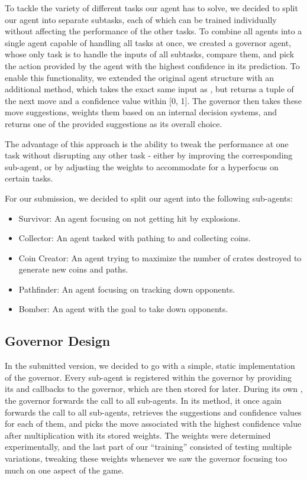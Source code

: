 To tackle the variety of different tasks our agent has to solve, we decided to split our agent into separate subtasks,
each of which can be trained individually without affecting the performance of the other tasks.
To combine all agents into a single agent capable of handling all tasks at once, we created a governor agent, whose only
task is to handle the inputs of all subtasks, compare them, and pick the action provided by the agent with the highest
confidence in its prediction.
To enable this functionality, we extended the original agent structure with an additional 
method, which takes the exact same input as , but returns a tuple of the next move and a confidence
value within [0, 1].
The governor then takes these move suggestions, weights them based on an internal decision systems, and returns one of
the provided suggestions as its overall choice.

The  advantage of this approach is the ability to tweak the performance at one task without disrupting any other task -
either by improving the corresponding sub-agent, or by adjusting the weights to accommodate for a hyperfocus on certain
tasks.

For our submission, we decided to split our agent into the following sub-agents:
\begin{itemize}
  \item Survivor: An agent focusing on not getting hit by explosions.
  \item Collector: An agent tasked with pathing to and collecting coins.
  \item Coin Creator: An agent trying to maximize the number of crates destroyed to generate new coins and paths.
  \item Pathfinder: An agent focusing on tracking down opponents.
  \item Bomber: An agent with the goal to take down opponents.
\end{itemize}

\subsection{Governor Design}
\label{subsec:design-governor}
In the submitted version, we decided to go with a simple, static implementation of the governor.
Every sub-agent is registered within the governor by providing its  and 
callbacks to the governor, which are then stored for later.
During its own , the governor forwards the call to all sub-agents.
In its  method, it once again forwards the call to all sub-agents, retrieves the suggestions and
confidence values for each of them, and picks the move associated with the highest confidence value after multiplication
with its stored weights.
The weights were determined experimentally, and the last part of our \enquote{training} consisted of testing multiple
variations, tweaking these weights whenever we saw the governor focusing too much on one aspect of the game.


